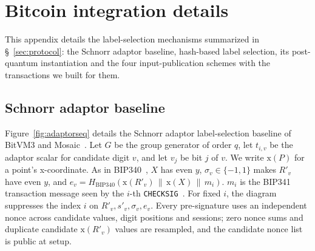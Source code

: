\documentclass[11pt]{article}
\begin{document}
\appendix
\section{Bitcoin integration details}\label{app:protocol}

This appendix details the label-selection mechanisms summarized in
\S~\ref{sec:protocol}: the Schnorr adaptor baseline, hash-based label
selection, its post-quantum instantiation and the four input-publication
schemes with the transactions we built for them.

\subsection{Schnorr adaptor baseline}\label{app:adaptor}

Figure~\ref{fig:adaptorseq} details the Schnorr adaptor label-selection
baseline of BitVM3 and Mosaic~\cite{bitvm3paper,mosaic26}. Let $G$ be the group generator of order $q$, let $t_{i,v}$ be the adaptor
scalar for candidate digit $v$, and let $v_j$ be bit $j$ of $v$. We write
$\mathrm{x}(P)$ for a point's x-coordinate. As in BIP340~\cite{bip340}, $X$
has even $y$, $\sigma_v\in\{-1,1\}$ makes $R'_v$ have even $y$, and
$e_v=H_{\mathrm{BIP340}}(\mathrm{x}(R'_v)\,\|\,\mathrm{x}(X)\,\|\,m_i)$.
$m_i$ is the BIP341 transaction message seen by the $i$-th
\texttt{CHECKSIG}~\cite{bip341}.
For fixed $i$, the diagram suppresses the index $i$ on
$R'_v,s'_v,\sigma_v,e_v$. Every pre-signature uses an independent nonce
across candidate values, digit positions and sessions; zero nonce sums and
duplicate candidate $\mathrm{x}(R'_v)$ values are resampled, and the candidate
nonce list is public at setup.
\end{document}
